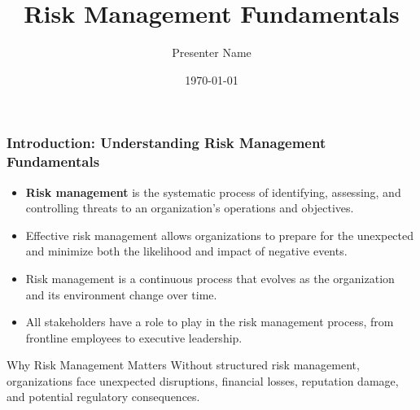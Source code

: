 \documentclass{beamer}
\title{Risk Management Fundamentals}
\author{Presenter Name}
\date{\today}
\begin{document}
\begin{frame}
\titlepage
\end{frame}

\begin{frame}
\frametitle{Introduction: Understanding Risk Management Fundamentals}
\begin{itemize}
  \item \textbf{Risk management} is the systematic process of identifying, assessing, and controlling threats to an organization's operations and objectives.
  \item Effective risk management allows organizations to prepare for the unexpected and minimize both the likelihood and impact of negative events.
  \item Risk management is a continuous process that evolves as the organization and its environment change over time.
  \item All stakeholders have a role to play in the risk management process, from frontline employees to executive leadership.
\end{itemize}

\begin{alertblock}{Why Risk Management Matters}
Without structured risk management, organizations face unexpected disruptions, financial losses, reputation damage, and potential regulatory consequences.
\end{alertblock}
\end{frame}
\end{document}
